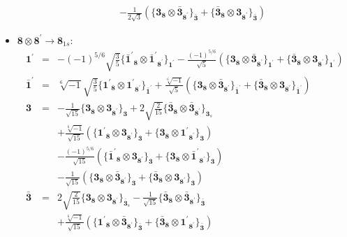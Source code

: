 \documentclass[english]{article}
\newcommand{\subcg}[3]{\big\{ {#1}\otimes{#2}\big\}^{}_{#3}}
\newcommand{\rep}[1]{\mathbf{#1}}
\begin{document}
\begin{itemize}
\begin{eqnarray*}
 & & -\frac{1}{2 \sqrt{3}}\left(\subcg{\rep{3}_{\rep{8}}}{\rep{\bar{3}}_{\rep{8^{\prime}}}}{\rep{\bar{3}}}+\subcg{\rep{\bar{3}}_{\rep{8}}}{\rep{3}_{\rep{8^{\prime}}}}{\rep{\bar{3}}}\right)
\end{eqnarray*}
\item $\rep{8}\otimes\rep{8^{\prime}}\to\rep{8}_{1s}$:
\begin{eqnarray*}
\rep{1^{\prime}} &=& -(-1)^{5/6} \sqrt{\frac{3}{5}}\subcg{\rep{\bar{1}^{\prime}}_{\rep{8}}}{\rep{\bar{1}^{\prime}}_{\rep{8^{\prime}}}}{\rep{1^{\prime}}}-\frac{(-1)^{5/6}}{\sqrt{5}}\left(\subcg{\rep{3}_{\rep{8}}}{\rep{\bar{3}}_{\rep{8^{\prime}}}}{\rep{1^{\prime}}}+\subcg{\rep{\bar{3}}_{\rep{8}}}{\rep{3}_{\rep{8^{\prime}}}}{\rep{1^{\prime}}}\right)
\\
\rep{\bar{1}^{\prime}} &=& \sqrt[6]{-1} \sqrt{\frac{3}{5}}\subcg{\rep{1^{\prime}}_{\rep{8}}}{\rep{1^{\prime}}_{\rep{8^{\prime}}}}{\rep{\bar{1}^{\prime}}}+\frac{\sqrt[6]{-1}}{\sqrt{5}}\left(\subcg{\rep{3}_{\rep{8}}}{\rep{\bar{3}}_{\rep{8^{\prime}}}}{\rep{\bar{1}^{\prime}}}+\subcg{\rep{\bar{3}}_{\rep{8}}}{\rep{3}_{\rep{8^{\prime}}}}{\rep{\bar{1}^{\prime}}}\right)
\\
\rep{3} &=& -\frac{1}{\sqrt{15}}\subcg{\rep{3}_{\rep{8}}}{\rep{3}_{\rep{8^{\prime}}}}{\rep{3}}+2 \sqrt{\frac{2}{15}}\subcg{\rep{\bar{3}}_{\rep{8}}}{\rep{\bar{3}}_{\rep{8^{\prime}}}}{\rep{3}_{s}} \\ 
 & & +\frac{\sqrt[6]{-1}}{\sqrt{15}}\left(\subcg{\rep{1^{\prime}}_{\rep{8}}}{\rep{3}_{\rep{8^{\prime}}}}{\rep{3}}+\subcg{\rep{3}_{\rep{8}}}{\rep{1^{\prime}}_{\rep{8^{\prime}}}}{\rep{3}}\right) \\ 
 & & -\frac{(-1)^{5/6}}{\sqrt{15}}\left(\subcg{\rep{\bar{1}^{\prime}}_{\rep{8}}}{\rep{3}_{\rep{8^{\prime}}}}{\rep{3}}+\subcg{\rep{3}_{\rep{8}}}{\rep{\bar{1}^{\prime}}_{\rep{8^{\prime}}}}{\rep{3}}\right) \\ 
 & & -\frac{1}{\sqrt{15}}\left(\subcg{\rep{3}_{\rep{8}}}{\rep{\bar{3}}_{\rep{8^{\prime}}}}{\rep{3}}+\subcg{\rep{\bar{3}}_{\rep{8}}}{\rep{3}_{\rep{8^{\prime}}}}{\rep{3}}\right)
\\
\rep{\bar{3}} &=& 2 \sqrt{\frac{2}{15}}\subcg{\rep{3}_{\rep{8}}}{\rep{3}_{\rep{8^{\prime}}}}{\rep{\bar{3}}_{s}}-\frac{1}{\sqrt{15}}\subcg{\rep{\bar{3}}_{\rep{8}}}{\rep{\bar{3}}_{\rep{8^{\prime}}}}{\rep{\bar{3}}} \\ 
 & & +\frac{\sqrt[6]{-1}}{\sqrt{15}}\left(\subcg{\rep{1^{\prime}}_{\rep{8}}}{\rep{\bar{3}}_{\rep{8^{\prime}}}}{\rep{\bar{3}}}+\subcg{\rep{\bar{3}}_{\rep{8}}}{\rep{1^{\prime}}_{\rep{8^{\prime}}}}{\rep{\bar{3}}}\right) \\ 

\end{eqnarray*}
\end{itemize}
\end{document}
